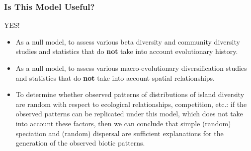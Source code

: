 \documentclass[11pt,t]{beamer}
\begin{document}
\begin{frame}
	\frametitle{Is This Model Useful?}
	\begin{center}
		{\huge YES!}
	\end{center}
	\begin{itemize}
		\item As a null model, to assess various beta diversity and community diversity studies and statistics that do \textbf{not} take into account evolutionary history.
		\item As a null model, to assess various macro-evolutionary diversification studies and statistics that do \textbf{not} take into account spatial relationships.
		\item To determine whether observed patterns of distributions of island diversity are random with respect to ecological relationships, competition, etc.: if the observed patterns can be replicated under this model, which does not take into account these factors, then we can conclude that simple (random) speciation and (random) dispersal are sufficient explanations for the generation of the observed biotic patterns.
	\end{itemize}
\end{frame}
\end{document}
